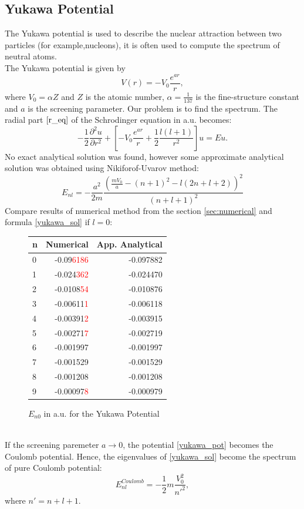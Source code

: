 \documentclass[a4paper, 14pt]{article}
\begin{document}
\subsection{Yukawa Potential}
The Yukawa potential is used to  describe the nuclear attraction between two particles (for example,nucleons), it is often used to compute the spectrum of neutral atoms.\\ 
The Yukawa potential is given by
\begin{equation}\label{yukawa_pot}
    V(r) = -V_0\frac{e^{a r}}{r},
\end{equation}
where $V_0 = \alpha Z$ and $Z$ is the atomic number, $\alpha = \frac{1}{137}$ is the fine-structure constant and $a$ is the screening parameter.
Our problem is to find the spectrum. The radial part $\eqref{r_eq}$ of the Schrodinger equation in a.u. becomes:
$$-\frac{1}{2}\frac{\partial^2 u}{\partial r^2}+[-V_0\frac{e^{a r}}{r} +\frac{1}{2}\frac{l(l+1)}{r^2}]u = Eu.$$
No exact analytical solution was found, however some approximate analytical solution was obtained using Nikiforof-Uvarov method: 
\begin{equation}\label{yukawa_sol}
    E_{nl} = -\frac{a^2}{2m}\frac{(\displaystyle{\frac{m V_0}{a}} - (n+1)^2 - l(2n+l+2))^2}{(n+l+1)^2}
\end{equation}
Compare results of numerical method from the section \ref{sec:numerical} and formula \eqref{yukawa_sol} if $l = 0$:
\begin{figure}[h!]
\centering
\begin{tabular}{lrr}
\toprule
{n} &  Numerical   &         App. Analytical \\
\midrule
0 & -0.09\textcolor{red}{6186} & -0.097882 \\
1 & -0.024\textcolor{red}{362} & -0.024470 \\
2 & -0.0108\textcolor{red}{54} & -0.010876 \\
3 & -0.00611\textcolor{red}{1} & -0.006118 \\
4 & -0.00391\textcolor{red}{2} & -0.003915 \\
5 & -0.00271\textcolor{red}{7} & -0.002719 \\
6 & -0.001997 & -0.001997 \\
7 & -0.001529 & -0.001529 \\
8 & -0.001208 & -0.001208 \\
9 & -0.00097\textcolor{red}{8} & -0.000979 \\
\bottomrule
\end{tabular}
\caption{$E_{n0}$ in a.u. for the Yukawa Potential}
\label{fig:Yakawa_spec}
\end{figure}\\
If the screening paremeter $ a\to 0$, the potential \eqref{yukawa_pot} becomes the Coulomb potential. Hence, the eigenvalues of \eqref{yukawa_sol} become the spectrum of pure Coulomb potential:
$$E_{nl}^{Coulomb} = -\frac{1}{2} m \frac{V_0^2}{n'^2},$$
where $n' = n+l+1.$
\end{document}
